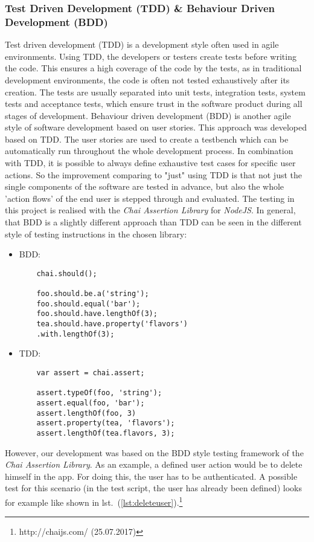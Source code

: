 \subsubsection{Test Driven Development (TDD) \& Behaviour Driven Development (BDD)}
\label{subsubsec:bddtdd}
Test driven development (TDD) is a development style often used in agile environments. Using TDD, the developers or testers create tests before writing the code. This ensures a high coverage of the code by the tests, as in traditional development environments, the code is often not tested exhaustively after its creation. The tests are usually separated into unit tests, integration tests, system tests and acceptance tests, which ensure trust in the software product during all stages of development.\newline
Behaviour driven development (BDD) is another agile style of software development based on user stories. This approach was developed based on TDD. The user stories are used to create a testbench which can be automatically run throughout the whole development process. In combination with TDD, it is possible to always define exhaustive test cases for specific user actions. So the improvement comparing to "just" using TDD is that not just the single components of the software are tested in advance, but also the whole 'action flows' of the end user is stepped through and evaluated.\newline\newline
The testing in this project is realised with the \textit{Chai Assertion Library} for \textit{NodeJS}. In general, that BDD is a slightly different approach than TDD can be seen in the different style of testing instructions in the chosen library: 
\begin{itemize}
	\item BDD: \begin{lstlisting}
	chai.should();
	
	foo.should.be.a('string');
	foo.should.equal('bar');
	foo.should.have.lengthOf(3);
	tea.should.have.property('flavors')
	.with.lengthOf(3);
	\end{lstlisting}
	\item TDD: \begin{lstlisting}
	var assert = chai.assert;
		
	assert.typeOf(foo, 'string');
	assert.equal(foo, 'bar');
	assert.lengthOf(foo, 3)
	assert.property(tea, 'flavors');
	assert.lengthOf(tea.flavors, 3);
	\end{lstlisting}
\end{itemize}
However, our development was based on the BDD style testing framework of the \textit{Chai Assertion Library}. As an example, a defined user action would be to delete himself in the app. For doing this, the user has to be authenticated. A possible test for this scenario (in the test script, the user has already been defined) looks for example like shown in lst.\ (\ref{lst:deleteuser}).\footnote{http://chaijs.com/ (25.07.2017)}

